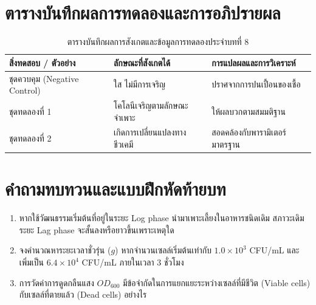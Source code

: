 \section{ตารางบันทึกผลการทดลองและการอภิปรายผล}
\begin{table}[H]
\centering\small
\caption{ตารางบันทึกผลการสังเกตและข้อมูลการทดลองประจำบทที่ 8}
\label{tab:ch08_datasheet}
\begin{tabularx}{\textwidth}{p{} p{} X}
\toprule
\textbf{สิ่งทดสอบ / ตัวอย่าง} & \textbf{ลักษณะที่สังเกตได้} & \textbf{การแปลผลและการวิเคราะห์} \\
\midrule
ชุดควบคุม (Negative Control) & ใส ไม่มีการเจริญ & ปราศจากการปนเปื้อนของเชื้อ \\
ชุดทดลองที่ 1 & โคโลนีเจริญตามลักษณะจำเพาะ & ให้ผลบวกตามสมมติฐาน \\
ชุดทดลองที่ 2 & เกิดการเปลี่ยนแปลงทางชีวเคมี & สอดคล้องกับพารามิเตอร์มาตรฐาน \\
\bottomrule
\end{tabularx}
\end{table}

\section{คำถามทบทวนและแบบฝึกหัดท้ายบท}
\begin{enumerate}
    \item หากใช้วัฒนธรรมเริ่มต้นที่อยู่ในระยะ Log phase นำมาเพาะเลี้ยงในอาหารชนิดเดิม สภาวะเดิม ระยะ Lag phase จะสั้นลงหรือยาวขึ้นเพราะเหตุใด
    \item จงคำนวณหาระยะเวลาชั่วรุ่น ($g$) หากจำนวนเซลล์เริ่มต้นเท่ากับ $1.0 \times 10^3$ CFU/mL และเพิ่มเป็น $6.4 \times 10^4$ CFU/mL ภายในเวลา 3 ชั่วโมง
    \item การวัดค่าการดูดกลืนแสง $OD_{600}$ มีข้อจำกัดในการแยกแยะระหว่างเซลล์ที่มีชีวิต (Viable cells) กับเซลล์ที่ตายแล้ว (Dead cells) อย่างไร
\end{enumerate}
